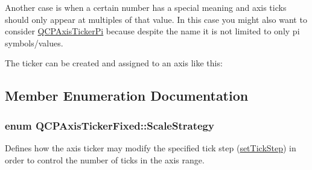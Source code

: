Another case is when a certain number has a special meaning and axis ticks should only appear at multiples of that value. In this case you might also want to consider \hyperlink{classQCPAxisTickerPi}{Q\+C\+P\+Axis\+Ticker\+Pi} because despite the name it is not limited to only pi symbols/values.

The ticker can be created and assigned to an axis like this\+: 
\begin{DoxyCodeInclude}
\end{DoxyCodeInclude}


\subsection{Member Enumeration Documentation}
\subsubsection[{\texorpdfstring{Scale\+Strategy}{ScaleStrategy}}]{\setlength{\rightskip}{0pt plus 5cm}enum {\bf Q\+C\+P\+Axis\+Ticker\+Fixed\+::\+Scale\+Strategy}}\hypertarget{classQCPAxisTickerFixed_a15b3d38b935d404b1311eb85cfb6a439}{}\label{classQCPAxisTickerFixed_a15b3d38b935d404b1311eb85cfb6a439}
Defines how the axis ticker may modify the specified tick step (\hyperlink{classQCPAxisTickerFixed_a4bc83d85a4f81d4abdd3fa5042d7b833}{set\+Tick\+Step}) in order to control the number of ticks in the axis range.

